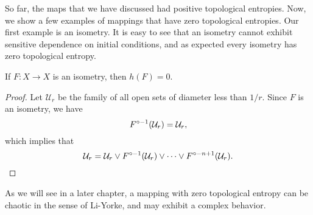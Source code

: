 \documentclass[12pt,twoside,draft]{book}
\begin{document}
So far, the maps that we have discussed had positive topological entropies.
Now, we show a few examples of mappings that have zero topological entropies.
Our first example is an isometry.
It is easy to see that an isometry cannot exhibit sensitive dependence on initial conditions, and as expected every isometry has zero topological entropy.
\begin{proposition}
  \citep{akm}
  If $F: X \to X$ is an isometry, then $h(F) = 0$.
\begin{proof}
  Let $\mathcal{U}_r$ be the family of all open sets of diameter less than $1/r$.
  Since $F$ is an isometry, we have
  \begin{equation*}
    F^{\circ -1}(\mathcal{U}_r) = \mathcal{U}_r,
  \end{equation*}
  which implies that
  \begin{equation*}
    \mathcal{U}_r = \mathcal{U}_r \vee F^{\circ -1}(\mathcal{U}_r) \vee \cdots \vee F^{\circ -n+1}(\mathcal{U}_r).
  \end{equation*}
\end{proof}
\end{proposition}
As we will see in a later chapter, a mapping with zero topological entropy can be chaotic in the sense of Li-Yorke, and may exhibit a complex behavior.




\printindex
\end{document}
